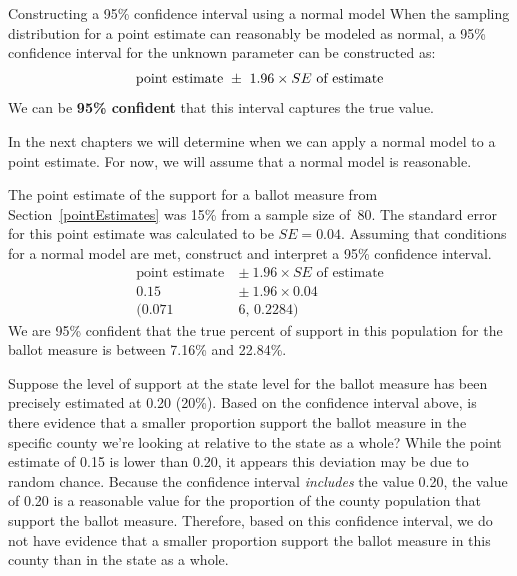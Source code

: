 \begin{onebox}{Constructing a 95\% confidence interval using a normal model}
When the sampling distribution for a point estimate can reasonably be modeled as normal, a 95\% confidence interval for the unknown parameter can be constructed as: \vspace{-2mm}
\begin{align}
\text{point estimate}\ \pm\ 1.96 \times SE\text{ of estimate}\vspace{-2mm}
\end{align}
We can be \textbf{95\% confident} that this interval captures the true value.\end{onebox}
\label{95PercentConfidenceIntervalFormula}


In the next chapters we will determine when we can apply a normal model to a point estimate. For now, we will assume that a normal model is reasonable. 

\begin{examplewrap}
\begin{nexample}{The point estimate of the support for a ballot measure
    from Section~\ref{pointEstimates} was 15\% from a sample size of~80.
    The standard error for this point estimate was calculated to be $SE = 0.04$.
    Assuming that conditions for a normal model are met,
    construct and interpret a 95\% confidence interval.  }
\begin{align*}
\text{point estimate}\ &\pm \ 1.96\times SE \text{ of estimate} \\
0.15\  &\pm \ 1.96\times 0.04\\
(0.071&6\text{, } 0.2284)
\end{align*}
We are 95\% confident that the true percent of support in this population
for the ballot measure is between 7.16\% and 22.84\%.
\end{nexample}
\end{examplewrap}

\begin{examplewrap}
\begin{nexample}{Suppose the level of support at the state level for the
    ballot measure has been precisely estimated at 0.20 (20\%).
    Based on the confidence interval above,
    is there evidence that a smaller proportion support the ballot measure
    in the specific county we're looking at relative to the state as a whole?}
While the point estimate of 0.15 is lower than 0.20, it appears this deviation
may be due to random chance.
Because the confidence interval \emph{includes} the value 0.20,
the value of 0.20 is a reasonable value for the proportion of the county
population that support the ballot measure.
Therefore, based on this confidence interval, we do not have evidence that
a smaller proportion support the ballot measure in this county than in the
state as a whole.
\end{nexample}
\end{examplewrap}

